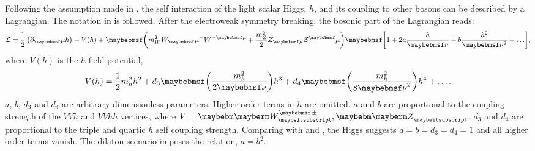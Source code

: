 Following the assumption made in  \cite{Contino:2010mh,Contino:2013gna}, the self interaction of the light scalar Higgs, $h$, and its coupling to other \SM bosons can be described by a Lagrangian. The notation in  \cite{Contino:2013gna} is followed. After the electroweak symmetry breaking, the bosonic part of the Lagrangian reads:
\begin{equation}
\Lagr =\frac{1}{2}\left(\partial_\mu{h}\right)  - V(h) + \parenths{m_W^2{W}_\mu^+{W}^{-\mu} + \frac{m_Z^2}{2}Z_{\mu}Z^\mu}\sqbracs{1 + 2a\frac{h}{\nu} + b \frac{h^2}{\nu^2} + \hdots},
\end{equation}
where $V(h)$ is the $h$ field potential,
\begin{equation}
V(h) = \frac{1}{2}m_h^2h^2 + d_3\parenths{\frac{m_h^2}{2\nu}}h^3 + d_4\parenths{\frac{m_h^2}{8{\nu}^2}}h^4 + \hdots .
\end{equation}
$a$, $b$, $d_3$ and $d_4$ are arbitrary dimensionless parameters. Higher order terms in $h$ are omitted. $a$ and $b$ are proportional to the coupling strength of the $VVh$ and $VVhh$ vertices, where $V = \PWpm, \PZ$. $d_3$ and $d_4$ are proportional to the triple and quartic $h$ self coupling strength. Comparing with  and , the \SM Higgs suggests $a=b=d_3=d_4=1$ and all higher order terms vanish. The dilaton scenario imposes the relation, $a = b^2$.

